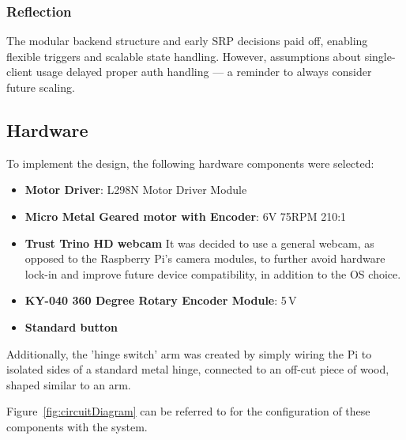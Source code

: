             \subsubsection*{Reflection}
                The modular backend structure and early SRP decisions paid off, enabling flexible triggers and scalable state handling. However, assumptions about single-client usage delayed proper auth handling — a reminder to always consider future scaling.
    
        \subsection{Hardware}
    
            To implement the design, the following hardware components were selected:
    
            \begin{itemize}
                \item \textbf{Motor Driver}: L298N Motor Driver Module
                \item \textbf{Micro Metal Geared motor with Encoder}: 6V 75RPM 210:1
                \item \textbf{Trust Trino HD webcam} It was decided to use a general webcam, as opposed to the Raspberry Pi's camera modules, to further avoid hardware lock-in and improve future device compatibility, in addition to the OS choice.
                \item \textbf{KY-040 360 Degree Rotary Encoder Module}: 5\,V
                \item \textbf{Standard button}
            \end{itemize}
    
            Additionally, the 'hinge switch' arm was created by simply wiring the Pi to isolated sides of a standard metal hinge, connected to an off-cut piece of wood, shaped similar to an arm.
    
            Figure~\ref{fig:circuitDiagram} can be referred to for the configuration of these components with the system.
    

